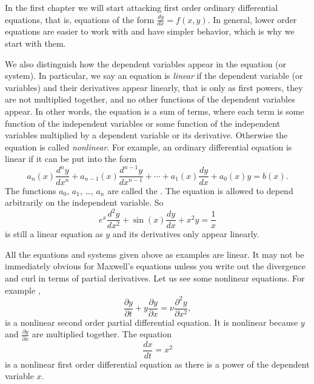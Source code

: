 In the first chapter we will start attacking first order ordinary
differential equations, that is, equations of the form $\frac{dy}{dx} = f(x,y)$.
In general, lower order equations are easier to work with and have simpler
behavior, which is why we start with them.

\medskip

We also distinguish how the dependent variables appear in the equation (or
system).  In particular, we say an equation is
\emph{linear} if the
dependent variable (or variables) and their derivatives appear linearly,
that is only as first powers, they are not multiplied together, and no other functions of the dependent
variables appear.  In other words, the equation is a sum of terms,
where each term is
some function of the independent variables
or 
some function of the independent variables
multiplied by a dependent variable
or its derivative.
Otherwise the equation is called
\emph{nonlinear}.
For example,
an ordinary differential equation is linear if it can be
put into the form
\begin{equation} \label{classification:eqlingen}
a_n(x) \frac{d^n y}{dx^n} + 
a_{n-1}(x) \frac{d^{n-1} y}{dx^{n-1}} + 
\cdots
+
a_{1}(x) \frac{dy}{dx}
+
a_{0}(x) y = b(x) .
\end{equation}
The functions $a_0$, $a_1$, \ldots, $a_n$ are called the
\emph{}.
The equation is allowed to depend arbitrarily on the independent variable.
So 
\begin{equation} \label{classification:eqlinex}
e^x \frac{d^2 y}{dx^2} + 
\sin(x) \frac{d y}{dx} + 
x^2 y
=
\frac{1}{x}
\end{equation}
is still a linear equation as $y$ and its derivatives only appear linearly.

All the equations and systems given above as examples are linear.  
It may not be immediately obvious for Maxwell's equations unless you write out
the divergence and curl in terms of partial derivatives.  Let us see some
nonlinear equations.  For example ,
\begin{equation*}
\frac{\partial y}{\partial t} + 
y \frac{\partial y}{\partial x} =
\nu \frac{\partial^2 y}{\partial x^2} ,
\end{equation*}
is a nonlinear second order partial differential equation.  It is nonlinear
because $y$ and $\frac{\partial y}{\partial x}$ are multiplied together.
The equation
\begin{equation} \label{classification:eqnonlinode}
\frac{dx}{dt} = x^2
\end{equation}
is a nonlinear first order differential equation as there is a power of
the dependent variable $x$.

